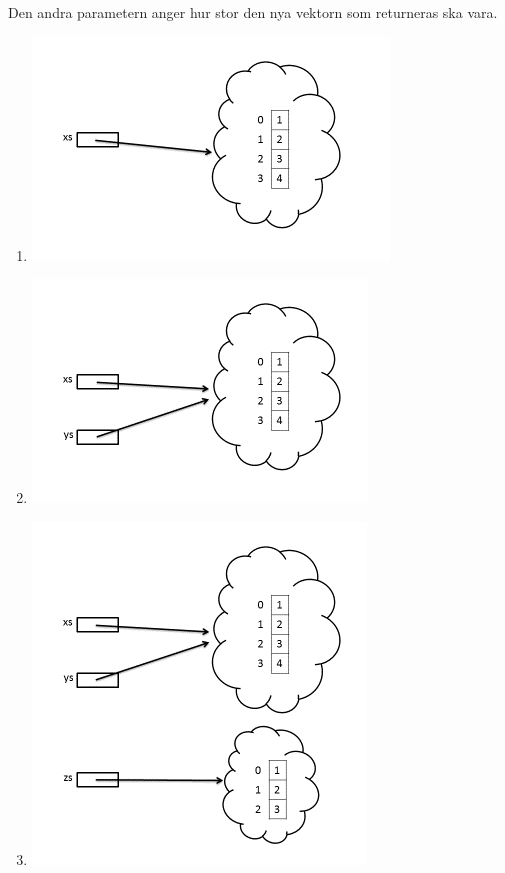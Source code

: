 \SOLUTION


\TaskSolved \what


\SubtaskSolved  Den andra parametern anger hur stor den nya vektorn som returneras ska vara.

\SubtaskSolved  \begin{enumerate}
\item \includegraphics[scale=1.2]{../img/w05-solutions/memory-pic-2}
\item \includegraphics[scale=1.2]{../img/w05-solutions/memory-pic-3}
\item \includegraphics[scale=1.2]{../img/w05-solutions/memory-pic-4}

\end{enumerate}

